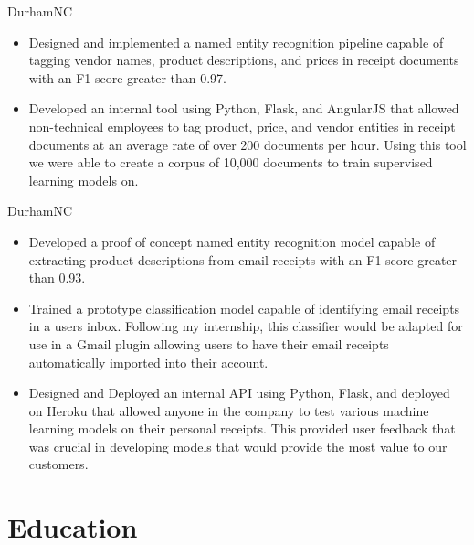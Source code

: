 \documentclass[11pt,a4paper,sans]{moderncv} %
\begin{document}
{Durham}{NC}{
\begin{itemize}[label=$-$]
\item Designed and implemented a named entity recognition pipeline capable of tagging vendor names, product descriptions, and prices in receipt documents with an F1-score greater than 0.97. 
\item Developed an internal tool using Python, Flask, and AngularJS that allowed non-technical employees to tag product, price, and vendor entities in receipt documents at an average rate of over 200 documents per hour. Using this tool we were able to create a corpus of 10,000 documents to train supervised learning models on. 
\end{itemize}
}

{Durham}{NC}{
\begin{itemize}[label=$-$]
    \item Developed a proof of concept named entity recognition model capable of extracting product descriptions from email receipts with an F1 score greater than 0.93. 
    \item Trained a prototype classification model capable of identifying email receipts in a users inbox. Following my internship, this classifier would be adapted for use in a Gmail plugin allowing users to have their email receipts automatically imported into their account.
    \item Designed and Deployed an internal API using Python, Flask, and deployed on Heroku that allowed anyone in the company to test various machine learning models on their personal receipts. This provided user feedback that was crucial in developing models that would provide the most value to our customers.
\end{itemize}
}







\section{Education}
\end{document}
